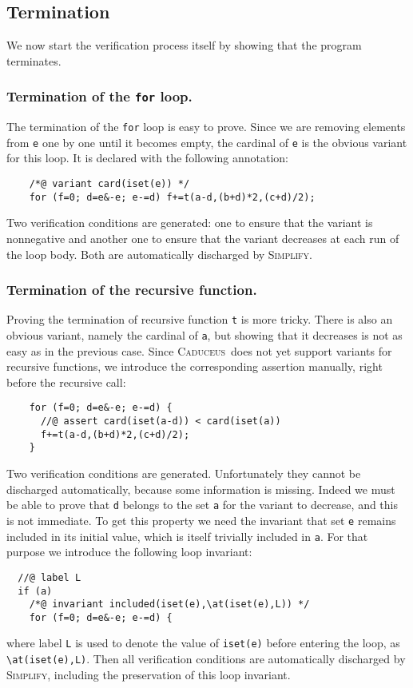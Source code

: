 \documentclass[a4paper]{llncs}
\newcommand{\caduceus}{\textsc{Caduceus}}
\newcommand{\simplify}{\textsc{Simplify}}
\begin{document}
\subsection{Termination}

We now start the verification process itself by showing that the
program terminates. 

\subsubsection{Termination of the \texttt{for} loop.}
The termination of the \texttt{for} loop is easy to prove.
Since we are removing elements from \texttt{e} one by one until it
becomes empty, the cardinal of \texttt{e} is the obvious variant for this
loop. It is declared with the following annotation:
\begin{verbatim}
    /*@ variant card(iset(e)) */
    for (f=0; d=e&-e; e-=d) f+=t(a-d,(b+d)*2,(c+d)/2);
\end{verbatim}
Two verification conditions are generated: one to ensure that the
variant is nonnegative and another one to ensure that the variant
decreases at each run of the loop body. Both are automatically
discharged by \simplify.

\subsubsection{Termination of the recursive function.}
Proving the termination of recursive function \texttt{t} is more
tricky. There is also an obvious variant, namely the cardinal of
\texttt{a}, but showing that it decreases is not as easy as in the
previous case. Since \caduceus\ does not yet support variants for
recursive functions, we introduce the corresponding
assertion manually, right before the recursive call:
\begin{verbatim}
    for (f=0; d=e&-e; e-=d) {
      //@ assert card(iset(a-d)) < card(iset(a))
      f+=t(a-d,(b+d)*2,(c+d)/2); 
    }
\end{verbatim}
Two verification conditions are generated. 
Unfortunately they cannot be discharged automatically, because 
some information is missing. Indeed we must be able to prove that
\texttt{d} belongs to the set \texttt{a} for the variant to decrease,
and this is not immediate. To get this property we need the invariant
that set \texttt{e} remains included in its initial value, which
is itself trivially included in \texttt{a}. For that purpose we
introduce the following loop invariant:
\begin{verbatim}
  //@ label L
  if (a)
    /*@ invariant included(iset(e),\at(iset(e),L)) */
    for (f=0; d=e&-e; e-=d) {
\end{verbatim}
where label \texttt{L} is used to denote the value of
\verb!iset(e)! before entering the loop, as \verb!\at(iset(e),L)!.
Then all verification conditions are automatically discharged by
\simplify, including the preservation of this loop invariant.
\end{document}
